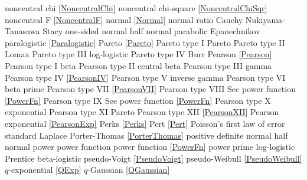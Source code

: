 noncentral chi					\dotfill	\eqref{NoncentralChi}				\ncite
noncentral chi-square			\dotfill	\eqref{NoncentralChiSqr}			\ncite
noncentral F					\dotfill	\eqref{NoncentralF}					\ncite	%
normal 							\dotfill	\eqref{Normal}						\ncite	%
normal ratio  					\dotfill	Cauchy 								\ncite	%
Nukiyama-Tanasawa 				\dotfill	Stacy 								   	%
%
one-sided normal  				\dotfill	half normal							\ncite	%
parabolic						\dotfill	Epanechnikov						\ncite
paralogistic					\dotfill	\eqref{Paralogistic} 				\ncite	%
Pareto							\dotfill	\eqref{Pareto}						\ncite	%
Pareto type I					\dotfill	Pareto								\ncite	%
Pareto type II					\dotfill	Lomax 								\ncite	%
Pareto type III					\dotfill	log-logistic						\ncite	%
Pareto type IV					\dotfill	Burr								\ncite	%
Pearson			 				\dotfill	\eqref{Pearson}						\ncite	%
Pearson type I					\dotfill	beta 								\ncite	%
Pearson type II					\dotfill	central beta						\ncite	%
Pearson type III   				\dotfill	gamma 								\ncite	%
Pearson type IV   				\dotfill	\eqref{PearsonIV} 					\ncite	%
Pearson type V    				\dotfill	inverse gamma						\ncite	%
Pearson type VI					\dotfill	beta prime 							\ncite	%
Pearson type VII				\dotfill	\eqref{PearsonVII} 					\ncite	%
Pearson type VIII				\dotfill	See power function \eqref{PowerFn}	\ncite	%
Pearson type IX					\dotfill	See power function \eqref{PowerFn}	\ncite	%
Pearson type X    				\dotfill	exponential							\ncite	%
Pearson type XI    				\dotfill	Pareto								
Pearson type XII 				\dotfill	\eqref{PearsonXII}					\ncite	%
Pearson exponential				\dotfill	\eqref{PearsonExp}					\mcite{\self}
Perks							\dotfill	\eqref{Perks} 						\ncite	%
Pert							\dotfill	\eqref{Pert} 						\ncite	%
Poisson's first law of error	\dotfill	standard Laplace					\ncite	%
Porter-Thomas					\dotfill	\eqref{PorterThomas}				\ncite
positive definite normal 		\dotfill	half normal 						\ncite 	%
power							\dotfill	power function 						\ncite	%
power function					\dotfill	\eqref{PowerFn}						\ncite	%
power prime						\dotfill	log-logistic						\mcite{\self}
Prentice 						\dotfill	beta-logistic							
pseudo-Voigt					\dotfill	\eqref{PseudoVoigt}					\ncite
pseudo-Weibull					\dotfill	\eqref{PseudoWeibull}				\ncite	%
%
$q$-exponential					\dotfill	\eqref{QExp}						\ncite	%
$q$-Gaussian					\dotfill	\eqref{QGaussian}					\ncite	%
